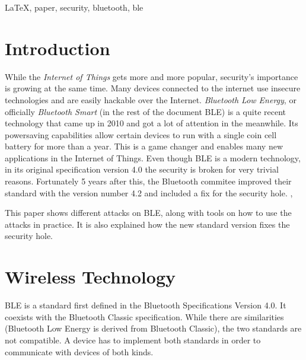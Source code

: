 \documentclass[conference]{IEEEtran}
\begin{document}
\begin{IEEEkeywords}
\LaTeX, paper, security, bluetooth, ble
\end{IEEEkeywords}






%
\IEEEpeerreviewmaketitle



\section{Introduction}
While the \emph{Internet of Things} gets more and more popular, security's 
importance is growing at the same time. Many devices connected to the internet 
use insecure technologies and are easily hackable over the Internet. 
\cite{iotsecanalysis} \emph{Bluetooth Low Energy}, or officially 
\emph{Bluetooth Smart} (in the rest of the document BLE) is a quite recent 
technology that came up in 2010 and got a lot of attention in the meanwhile. 
Its powersaving capabilities allow certain devices to run with a single coin 
cell battery for more than a year. \cite{blelowpower} This is a game changer 
and 
enables many new applications in the Internet of Things. Even though BLE is a 
modern technology, in its original specification version 4.0 the security is 
broken for very trivial reasons. Fortunately 5 years after this, the Bluetooth 
commitee improved their standard with the version number 4.2 and included a fix 
for the security hole. \cite{ble42},\cite{ble42announcement} 

This paper shows
different attacks on BLE, along with tools on how to use the attacks 
in practice. It is also explained how the new standard version fixes the 
security 
hole.

\section{Wireless Technology}

BLE is a standard first defined in the Bluetooth Specifications Version 4.0. It coexists with the Bluetooth Classic specification. While there are similarities (Bluetooth Low Energy is derived from Bluetooth Classic), the two standards are not compatible. A device has to implement both standards in order to communicate with devices of both kinds.
\end{document}
